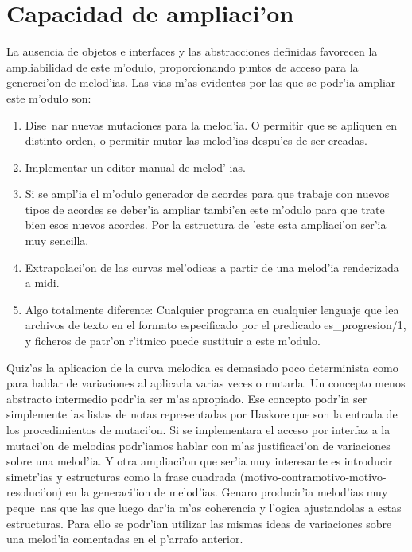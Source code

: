 ﻿\documentclass[a4paper,12pt]{article}
\begin{document}
\section {Capacidad de ampliaci'on}
La ausencia de objetos e interfaces y las abstracciones definidas favorecen la ampliabilidad de este m'odulo, proporcionando puntos de acceso para la generaci'on de melod'ias. Las vias m'as evidentes por las que se podr'ia ampliar este m'odulo son:
	\begin{enumerate}
	\item Dise~nar nuevas mutaciones para la melod'ia. O permitir que se apliquen en distinto orden, o permitir mutar las melod'ias despu'es de ser creadas.
	\item Implementar un editor manual de melod' ias.
	\item Si se ampl'ia el m'odulo generador de acordes para que trabaje con nuevos tipos de acordes se deber'ia ampliar tambi'en este m'odulo para que trate bien esos nuevos acordes. Por la estructura de 'este esta ampliaci'on ser'ia muy sencilla.
	\item Extrapolaci'on de las curvas mel'odicas a partir de una melod'ia renderizada a midi.
	\item Algo totalmente diferente: Cualquier programa en cualquier lenguaje que lea archivos de texto en el formato especificado por el predicado es\_progresion/1, y ficheros de patr'on r'itmico puede sustituir a este m'odulo.
	\end{enumerate}

Quiz'as la aplicacion de la curva melodica es demasiado poco determinista como para hablar de variaciones al aplicarla varias veces o mutarla. Un concepto menos abstracto intermedio podr'ia ser m'as apropiado. Ese concepto podr'ia ser simplemente las listas de notas representadas por Haskore que son la entrada de los procedimientos de mutaci'on. Si se implementara el acceso por interfaz a la mutaci'on de melodias podr'iamos hablar con m'as justificaci'on de variaciones sobre una melod'ia.\newline
Y otra ampliaci'on que ser'ia muy interesante es introducir simetr'ias y estructuras como la frase cuadrada (motivo-contramotivo-motivo-resoluci'on) en la generaci'ion de melod'ias. Genaro producir'ia melod'ias muy peque~nas que las que luego dar'ia m'as coherencia y l'ogica ajustandolas a estas estructuras. Para ello se podr'ian utilizar las mismas ideas de variaciones sobre una melod'ia comentadas en el p'arrafo anterior.
\end{document}
